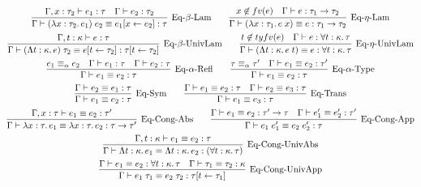 \begin{gather*}
  \infer[\text{Eq-$\beta$-Lam}]{\Gamma \vdash (\lambda x: \tau_2\ldotp e_1)\; e_2 \equiv e_1[x \assign e_2]: \tau}{
    \Gamma, x: \tau_2 \vdash e_1: \tau
    &
    \Gamma \vdash e_2: \tau_2
  }
  \hspace{2em}
  \infer[\text{Eq-$\eta$-Lam}]{\Gamma \vdash (\lambda x: \tau_1\ldotp e\; x) \equiv e: \tau_1 \to \tau_2}{
    x \not\in \freevar(e)
    &
    \Gamma \vdash e: \tau_1 \to \tau_2
  }
  \\
  \infer[\text{Eq-$\beta$-UnivLam}]{\Gamma \vdash (\Lambda t: \kappa\ldotp e)\; \tau_2 \equiv e[t \assign \tau_2]: \tau[t \assign \tau_2]}{
    \Gamma, t: \kappa \vdash e: \tau
  }
  \hspace{2em}
  \infer[\text{Eq-$\eta$-UnivLam}]{\Gamma \vdash (\Lambda t: \kappa\ldotp e\; t) \equiv e: \forall t: \kappa\ldotp \tau}{
    t \not\in \typefreevar(e)
    &
    \Gamma \vdash e: \forall t: \kappa\ldotp \tau
  }
  \\
  \infer[\text{Eq-$\alpha$-Refl}]{\Gamma \vdash e_1 \equiv e_2: \tau}{
    e_1 \equiv_\alpha e_2
    &
    \Gamma \vdash e_1: \tau
    &
    \Gamma \vdash e_2: \tau
  }
  \hspace{2em}
  \infer[\text{Eq-$\alpha$-Type}]{\Gamma \vdash e_1 \equiv e_2: \tau}{
    \tau \equiv_\alpha \tau'
    &
    \Gamma \vdash e_1 \equiv e_2: \tau'
  }
  \\
  \infer[\text{Eq-Sym}]{\Gamma \vdash e_1 \equiv e_2: \tau}{
    \Gamma \vdash e_2 \equiv e_1: \tau
  }
  \hspace{2em}
  \infer[\text{Eq-Trans}]{\Gamma \vdash e_1 \equiv e_3: \tau}{
    \Gamma \vdash e_1 \equiv e_2: \tau
    &
    \Gamma \vdash e_2 \equiv e_3: \tau
  }
  \\
  \infer[\text{Eq-Cong-Abs}]{\Gamma \vdash \lambda x: \tau\ldotp e_1 \equiv \lambda x: \tau\ldotp e_2: \tau \to \tau'}{
    \Gamma, x: \tau \vdash e_1 \equiv e_2: \tau'
  }
  \hspace{2em}
  \infer[\text{Eq-Cong-App}]{\Gamma \vdash e_1\; e'_1 \equiv e_2\; e'_2: \tau}{
    \Gamma \vdash e_1 \equiv e_2: \tau' \to \tau
    &
    \Gamma \vdash e'_1 \equiv e'_2: \tau'
  }
  \\
  \infer[\text{Eq-Cong-UnivAbs}]{\Gamma \vdash \Lambda t: \kappa\ldotp e_1 \equiv \Lambda t: \kappa\ldotp e_2: (\forall t: \kappa\ldotp \tau)}{
    \Gamma, t: \kappa \vdash e_1 \equiv e_2: \tau
  }
  \\
  \infer[\text{Eq-Cong-UnivApp}]{\Gamma \vdash e_1\; \tau_1 \equiv e_2\; \tau_2: \tau[t \assign \tau_1]}{
    \Gamma \vdash e_1 \equiv e_2: \forall t: \kappa\ldotp \tau
    &
    \Gamma \vdash \tau_1 \equiv \tau_2: \kappa
  }
\end{gather*}

